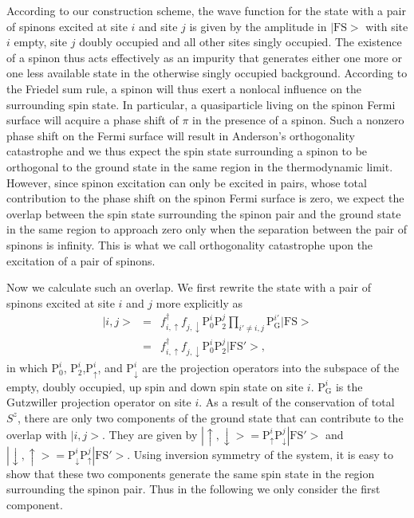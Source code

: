 \documentclass[12pt]{article}
\begin{document}
According to our construction scheme, the wave function for the state with a pair of spinons excited at site $i$ and site $j$ is given by the amplitude in $|\mathrm{FS}>$ with site $i$ empty, site $j$ doubly occupied and all other sites singly occupied. The existence of a spinon thus acts effectively as an impurity that generates either one more or one less available state in the otherwise singly occupied background. According to the Friedel sum rule, a spinon will thus exert a nonlocal influence on the surrounding spin state. In particular, a quasiparticle living on the spinon Fermi surface will acquire a phase shift of $\pi$ in the presence of a spinon.  Such a nonzero phase shift on the Fermi surface will result in Anderson's orthogonality catastrophe and we thus expect the spin state surrounding a spinon to be orthogonal to the ground state in the same region in the thermodynamic limit. However, since spinon excitation can only be excited in pairs, whose total contribution to the phase shift on the spinon Fermi surface is zero, we expect the overlap between the spin state surrounding the spinon pair and the ground state in the same region to approach zero only when the separation between the pair of spinons is infinity. This is what we call orthogonality catastrophe upon the excitation of a pair of spinons.

Now we calculate such an overlap. We first rewrite the state with a pair of spinons excited at site $i$ and $j$ more explicitly as 
\begin{eqnarray}
|i,j>&=&f^{\dagger}_{i,\uparrow}f_{j,\downarrow}\mathrm{P}^{i}_{0}\mathrm{P}^{j}_{2}\prod_{i'\neq i,j}\mathrm{P}^{i'}_{\mathrm{G}}|\mathrm{FS}>\nonumber\\
&=&f^{\dagger}_{i,\uparrow}f_{j,\downarrow}\mathrm{P}^{i}_{0}\mathrm{P}^{j}_{2}|\mathrm{FS'}>,\nonumber
\end{eqnarray}
in which $\mathrm{P}^{i}_{0}$, $\mathrm{P}^{i}_{2}$,$\mathrm{P}^{i}_{\uparrow}$, and $\mathrm{P}^{i}_{\downarrow}$ are the projection operators into the subspace of the empty, doubly occupied, up spin and down spin state on site $i$. $\mathrm{P}^{i}_{\mathrm{G}}$ is the Gutzwiller projection operator on site $i$. As a result of the conservation of total $S^{z}$, there are only two components of the ground state that can contribute to the overlap with $|i,j>$. They are given by $|\uparrow,\downarrow>=\mathrm{P}^{i}_{\uparrow}\mathrm{P}^{j}_{\downarrow}|\mathrm{FS'}>$ and  $|\downarrow,\uparrow>=\mathrm{P}^{i}_{\downarrow}\mathrm{P}^{j}_{\uparrow}|\mathrm{FS'}>$. Using inversion symmetry of the system, it is easy to show that these two components generate the same spin state in the region surrounding the spinon pair. Thus in the following we only consider the first component.
\end{document}
